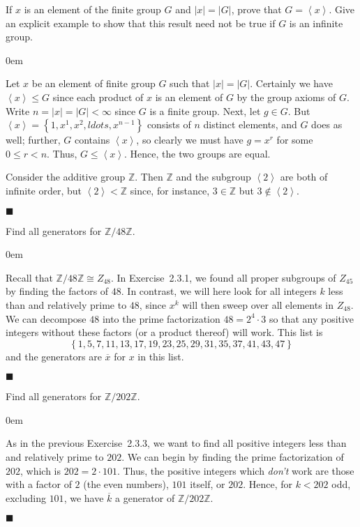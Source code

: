 \documentclass[12pt]{article}
\renewcommand{\qed}{\hfill$\blacksquare$}
\renewenvironment{proof}{\begin{addmargin}[1em]{0em}\begin{newproof}}{\end{newproof}\end{addmargin}\qed}
\newenvironment{problem}[2][Exercise]{\begin{trivlist}
\item[\hskip \labelsep {\bfseries #1}\hskip \labelsep {\bfseries #2.}]}{\end{trivlist}}
\begin{document}
\begin{problem}{2.3.2}
If $x$ is an element of the finite group $G$ and $\left|x\right|=\left|G\right|$, prove that $G=\left\langle x\right\rangle$. Give an explicit example to show that this result need not be true if $G$ is an infinite group.
\end{problem}
\begin{proof}
Let $x$ be an element of finite group $G$ such that $\left|x\right|=\left|G\right|$. Certainly we have $\left\langle x\right\rangle \leq G$ since each product of $x$ is an element of $G$ by the group axioms of $G$. Write $n=\left|x\right|=\left|G\right| < \infty$ since $G$ is a finite group. Next, let $g\in G$. But $\left\langle x\right\rangle = \left\{1,x^1,x^2,
ldots,x^{n-1}\right\}$ consists of $n$ distinct elements, and $G$ does as well; further, $G$ contains $\left\langle x\right\rangle $, so clearly we must have $g=x^r$ for some $0\leq r <n$. Thus, $G \leq \left\langle x\right\rangle$. Hence, the two groups are equal.

Consider the additive group $\mathbb{Z}$. Then $\mathbb{Z}$ and the subgroup $\left\langle 2\right\rangle$ are both of infinite order, but $\left\langle 2\right\rangle < \mathbb{Z}$ since, for instance, $3 \in \mathbb{Z}$ but $3\not\in \left\langle 2\right\rangle$.
\end{proof}


\begin{problem}{2.3.3}
Find all generators for $\mathbb{Z}/48\mathbb{Z}$.
\end{problem}
\begin{proof}
Recall that $\mathbb{Z}/48\mathbb{Z} \cong Z_{48}$. In Exercise~2.3.1, we found all proper subgroups of $Z_{45}$ by finding the factors of $48$. In contrast, we will here look for all integers $k$ less than and relatively prime to $48$, since $x^k$ will then sweep over all elements in $Z_{48}$. We can decompose $48$ into the prime factorization $48 = 2^4\cdot 3$ so that any positive integers without these factors (or a product thereof) will work. This list is \[ \left\{ 1,5,7,11,13,17,19,23,25,29,31,35,37,41,43,47\right\} \] and the generators are $\overline{x}$ for $x$ in this list.
\end{proof}


\begin{problem}{2.3.4}
Find all generators for $\mathbb{Z}/202\mathbb{Z}$.
\end{problem}
\begin{proof}
As in the previous Exercise~2.3.3, we want to find all positive integers less than and relatively prime to $202$. We can begin by finding the prime factorization of $202$, which is $202=2\cdot 101$. Thus, the positive integers which \textit{don't} work are those with a factor of $2$ (the even numbers), $101$ itself, or $202$. Hence, for $k<202$ odd, excluding $101$, we have $\overline{k}$ a generator of $\mathbb{Z}/202\mathbb{Z}$.
\end{proof}
\end{document}

